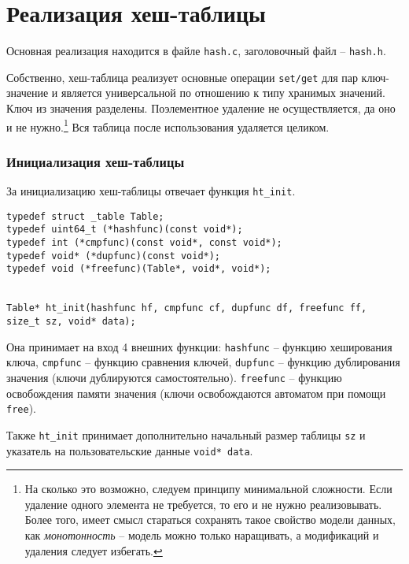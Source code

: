 \documentclass[10pt]{report}
\begin{document}
\chapter{Реализация хеш-таблицы}
\label{sec:hash-table}

Основная реализация находится в файле \texttt{hash.c}, заголовочный файл -- \texttt{hash.h}.

Собственно, хеш-таблица реализует основные операции \texttt{set/get} для пар ключ-значение и является универсальной по отношению к типу хранимых значений. 
Ключ из значения разделены. 
 Поэлементное удаление не осуществляется, да оно и не нужно.\footnote{На сколько это возможно, следуем принципу минимальной сложности. Если удаление одного элемента не требуется, то его и не нужно реализовывать. Более того, имеет смысл стараться сохранять такое свойство модели данных, как \emph{монотонность} -- модель можно только наращивать, а модификаций и удаления следует избегать.} 
 Вся таблица после использования удаляется целиком.
\subsection{Инициализация хеш-таблицы}
\label{ht-init}
За инициализацию хеш-таблицы отвечает функция \texttt{ht\_init}. 
 
\begin{lstlisting}[firstnumber=5]
typedef struct _table Table;
typedef uint64_t (*hashfunc)(const void*);
typedef int (*cmpfunc)(const void*, const void*);
typedef void* (*dupfunc)(const void*);
typedef void (*freefunc)(Table*, void*, void*);


Table* ht_init(hashfunc hf, cmpfunc cf, dupfunc df, freefunc ff, size_t sz, void* data);
\end{lstlisting}
Она принимает на вход 4 внешних функции: \texttt{hashfunc} -- функцию хеширования ключа,
 \texttt{cmpfunc} -- функцию сравнения ключей, 
 \texttt{dupfunc} -- функцию дублирования значения (ключи дублируются самостоятельно). 
 \texttt{freefunc} -- функцию освобождения памяти значения (ключи освобождаются автоматом при помощи \texttt{free}).
 
 Также \texttt{ht\_init} принимает дополнительно начальный размер таблицы \texttt{sz} и указатель на пользовательские данные \texttt{void* data}.
\end{document}
